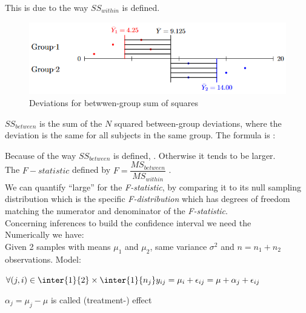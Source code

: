  This is due to the way $SS_{within}$ is defined.

\begin{figure}[H]
	\begin{center}
		\includegraphics[width=\textwidth]{./chap/1chap/2sec/3images/4_anovaBtw.PNG}
	\end{center}
	\caption{Deviations for betwwen-group sum of squares}
	\label{fig:4_anovaBtw}
\end{figure}
$SS_{between}$ is the sum of the $N$ squared between-group deviations, where the deviation is
the same for all subjects in the same group. The formula is : 
\begin{center}
\end{center}
Because of the way $SS_{between}$ is defined, . Otherwise it tends to be larger. \\
The $F-statistic$ defined by $F=\dfrac{MS_{between}}{MS_{within}}$ .\\

We can quantify ``large'' for the \emph{F-statistic}, by comparing it to its null sampling 
distribution which is the specific \emph{F-distribution}  which has degrees of freedom matching
the numerator and denominator of the \emph{F-statistic}.\\
Concerning inferences to build the confidence interval we need the \\

Numerically we have:\\
Given 2 samples with means $\mu_{1}$ and $\mu_{2}$, same variance $\sigma^{2}$ and $n=n_{1}+n_{2}$
observations.
Model: 
\begin{center}
	$\forall (j,i)\in\inter{1}{2}\times\inter{1}{n_{j}}y_{ij} = \mu_{i} + \epsilon_{ij} = \mu + \alpha_{j} + \epsilon_{ij}$
\end{center}
$\alpha_{j}=\mu_{j}-\mu$ is called (treatment-) effect

